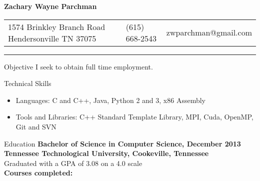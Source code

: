 \documentclass[10pt]{res}
\newcommand{\tightensection}{\vspace{-5mm}}
\begin{document}
 



\fontsize{10}{11}\selectfont

\begin{resume}

\vspace{-15mm}
\begin{center}
\begin{Huge}
    \bf{Zachary Wayne Parchman}
\end{Huge}
\end{center}


\begin{large}
\begin{tabularx}{\textwidth}{p{2.25in} X X}
    1574 Brinkley Branch Road \newline Hendersonville TN 37075
    & (615) 668-2543 & zwparchman@gmail.com\\
\end{tabularx}
\end{large}

\vspace{-0.30in}
\rule{\textwidth}{0.4pt}
\vspace{-0.30in}

\begin{section}{Objective}
    I seek to obtain full time employment.
\end{section}

\tightensection
\begin{section}{Technical Skills}
\begin{itemize}[leftmargin=*] \itemsep -2pt  %
    \item {Languages: C and C++, Java, Python 2 and 3, x86 Assembly}
    \item {Tools and Libraries: C++ Standard Template Library, MPI, Cuda, OpenMP, Git and SVN}
\end{itemize}
\end{section}

\tightensection
\begin{section}{Education}
    {\bf Bachelor of Science in Computer Science, December 2013\\
    Tennessee Technological University, Cookeville, Tennessee}\\
    Graduated with a GPA of 3.08 on a 4.0 scale\\
    {\bf Courses completed:}


\end{section}
\end{resume}
\end{document}
